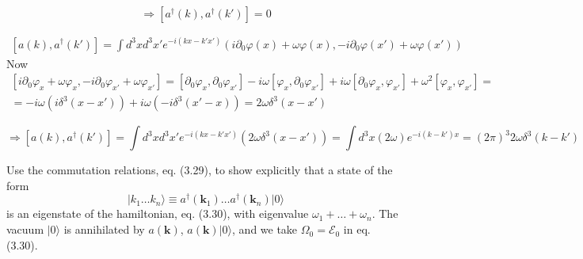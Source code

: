 \documentclass[twoside]{amsart}
\newcommand{\problemhead}[1]
  {\smallskip
   \noindent{\large\bf Problem #1.}
   }
\begin{document}
\[
\Longrightarrow \boxed{ \left[ a^{\dag}(k), a^{\dag}(k') \right] =0 }
\]

\[
\begin{gathered}
\left[ a(k), a^{\dag}(k') \right] = \int d^3x d^3x' e^{-i (kx-k'x') } \left( i \partial_0 \varphi(x) + \omega \varphi(x), -i \partial_0 \varphi(x') + \omega \varphi(x') \right)
\end{gathered}
\]
Now
\[
\begin{gathered}
  \left[ i \partial_0 \varphi_x + \omega \varphi_x, -i \partial_0 \varphi_{x'} + \omega \varphi_{x'} \right] = [ \partial_0 \varphi_x , \partial_0 \varphi_{x'} ] - i \omega [ \varphi_x, \partial_0 \varphi_{x'} ] + i\omega [ \partial_0 \varphi_x, \varphi_{x'} ] + \omega^2 [\varphi_x, \varphi_{x'} ] = \\
  = - i \omega (i \delta^3(x - x') ) + i \omega (-i\delta^3(x' - x) ) = 2 \omega \delta^3(x-x')
\end{gathered}
\]

\[
\Longrightarrow \left[ a(k), a^{\dag}(k') \right] = \int d^3x d^3x' e^{-i(kx-k'x') }(2\omega \delta^3(x-x') ) = \int d^3x (2 \omega) e^{-i(k-k')x } = \boxed{ (2\pi)^3 2\omega \delta^3(k-k') }
\]

\problemhead{3.2} Use the commutation relations, eq. (3.29), to show explicitly that a state of the form 
\[
\left| k_1 \dots k_n \rangle \right. \equiv a^{\dag}(\mathbf{k}_1) \dots a^{\dag}(\mathbf{k}_n) \left| 0 \rangle \right.
\]
is an eigenstate of the hamiltonian, eq. (3.30), with eigenvalue $\omega_1 + \dots + \omega_n$.  The vacuum $\left| 0\rangle \right.$ is annihilated by $a(\mathbf{k})$, $a(\mathbf{k})\left| 0 \rangle \right.$, and we take $\Omega_0 = \mathcal{E}_0$ in eq. (3.30).  
\end{document}
